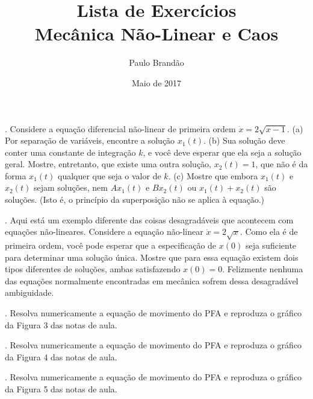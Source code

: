 \documentclass{article}
\title{\color{astral} \textbf{Lista de Exercícios} \\ \textbf{Mecânica Não-Linear e Caos}}
\author{Paulo Brandão}
\date{Maio de 2017}
\begin{document}
\maketitle

. Considere a equação diferencial não-linear de primeira ordem $\dot{x} = 2\sqrt{x-1}$. (a) Por separação de variáveis, encontre a solução $x_1 (t)$. (b) Sua solução deve conter uma constante de integração $k$, e você deve esperar que ela seja a solução geral. Mostre, entretanto, que existe uma outra solução, $x_2 (t) = 1$, que não é da forma $x_1 (t)$ qualquer que seja o valor de $k$. (c) Mostre que embora $x_1 (t)$ e $x_2 (t)$ sejam soluções, nem $Ax_1 (t)$ e $Bx_2 (t)$ ou $x_1 (t) + x_2 (t)$ são soluções. (Isto é, o princípio da superposição não se aplica à equação.) 

\vspace{1cm}

. Aqui está um exemplo diferente das coisas desagradáveis que acontecem com equações não-lineares. Considere a equação não-linear $\dot{x} = 2\sqrt{x}$. Como ela é de primeira ordem, você pode esperar que a especificação de $x(0)$ seja suficiente para determinar uma solução única. Mostre que para essa equação existem dois tipos diferentes de soluções, ambas satisfazendo $x(0) = 0$. Felizmente nenhuma das equações normalmente encontradas em mecânica sofrem dessa desagradável ambiguidade.

\vspace{1cm}

. Resolva numericamente a equação de movimento do PFA e reproduza o gráfico da Figura 3 das notas de aula.

\vspace{1cm}

. Resolva numericamente a equação de movimento do PFA e reproduza o gráfico da Figura 4 das notas de aula.

\vspace{1cm}

. Resolva numericamente a equação de movimento do PFA e reproduza o gráfico da Figura 5 das notas de aula.
\end{document}
